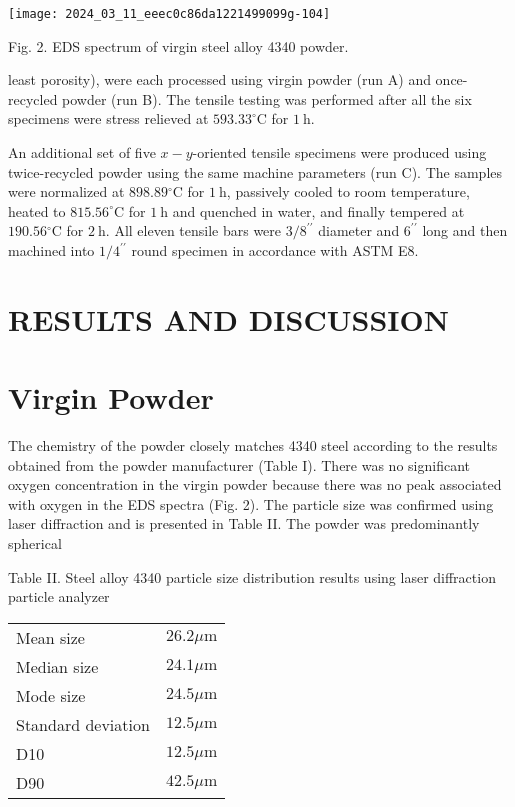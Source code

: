 \documentclass[10pt]{article}
\begin{document}
\begin{center}
\texttt{[image: 2024\_03\_11\_eeec0c86da1221499099g-104]}
\end{center}

Fig. 2. EDS spectrum of virgin steel alloy 4340 powder.

least porosity), were each processed using virgin powder (run A) and once-recycled powder (run B). The tensile testing was performed after all the six specimens were stress relieved at $593.33^{\circ} \mathrm{C}$ for $1 \mathrm{~h}$.

An additional set of five $x-y$-oriented tensile specimens were produced using twice-recycled powder using the same machine parameters (run C). The samples were normalized at $898.89{ }^{\circ} \mathrm{C}$ for $1 \mathrm{~h}$, passively cooled to room temperature, heated to $815.56^{\circ} \mathrm{C}$ for $1 \mathrm{~h}$ and quenched in water, and finally tempered at $190.56{ }^{\circ} \mathrm{C}$ for $2 \mathrm{~h}$. All eleven tensile bars were $3 / 8^{\prime \prime}$ diameter and $6^{\prime \prime}$ long and then machined into $1 / 4^{\prime \prime}$ round specimen in accordance with ASTM E8.

\section*{RESULTS AND DISCUSSION}
\section*{Virgin Powder}
The chemistry of the powder closely matches 4340 steel according to the results obtained from the powder manufacturer (Table I). There was no significant oxygen concentration in the virgin powder because there was no peak associated with oxygen in the EDS spectra (Fig. 2). The particle size was confirmed using laser diffraction and is presented in Table II. The powder was predominantly spherical

Table II. Steel alloy 4340 particle size distribution results using laser diffraction particle analyzer

\begin{center}
\begin{tabular}{ll}
\hline
Mean size & $26.2 \mu \mathrm{m}$ \\
Median size & $24.1 \mu \mathrm{m}$ \\
Mode size & $24.5 \mu \mathrm{m}$ \\
Standard deviation & $12.5 \mu \mathrm{m}$ \\
D10 & $12.5 \mu \mathrm{m}$ \\
D90 & $42.5 \mu \mathrm{m}$ \\
\hline
\end{tabular}
\end{center}
\end{document}
